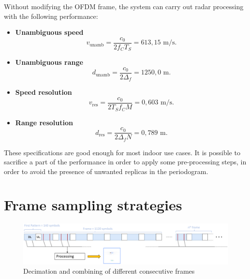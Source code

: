 Without modifying the OFDM frame, the system can carry out radar processing with the following performance:

\begin{itemize}
    \item \textbf{Unambiguous speed}
     \vspace{-\baselineskip} %
            \begin{equation}
                v_{\text{unamb}} = \frac{c_0}{2f_C T_S} = 613,15\text{ m/s}.
            \end{equation}
           
     \item \textbf{Unambiguous range}
            \begin{equation}
                d_{\text{unamb}} = \frac{c_0}{2\Delta_f} = 1250,0\text{ m}.
            \end{equation}
     \item \textbf{Speed resolution}
            \begin{equation}
                v_{\text{res}} = \frac{c_0}{2T_Sf_CM} = 0,603 \text{ m/s}.
            \end{equation} 
     \item \textbf{Range resolution}
            \begin{equation}
                d_{\text{res}} = \frac{c_0}{2\Delta_fN} = 0,789 \text{ m}.
            \end{equation}  
\end{itemize}

These specifications are good enough for most indoor use cases. It is possible to sacrifice a part of the performance in order to apply some pre-processing steps, in order to avoid the presence of unwanted replicas in the periodogram.


\section{Frame sampling strategies}

    \begin{figure}[H]
        \centering
        \includegraphics[width=1\textwidth]{Images/TDDprocessing/TDDstrategies.eps}
        \caption{Decimation and combining of different consecutive frames}
        \label{fig:TDDstrategies}
    \end{figure}

